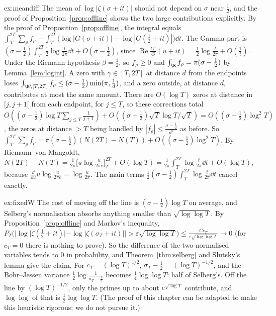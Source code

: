 \begin{solution}{ex:meandiff}
\idea The mean of $\log|\zeta(\sigma+it)|$ should not depend on $\sigma$ near $\frac12$, and the proof of Proposition~\ref{prop:offline} shows the two large contributions explicitly.
\writeup By the proof of Proposition~\ref{prop:offline}, the integral equals $\int_T^{2T}\sum_\rho f_\rho-\int_T^{2T}\bigl(\log|G(\sigma+it)|-\log|G(\frac12+it)|\bigr)\dd t$. The Gamma part is $(\sigma-\frac12)\int_T^{2T}\frac12\log\frac t{2\pi}\dd t+O(\sigma-\frac12)$, since $\operatorname{Re}\frac{G'}G(u+it)=\frac12\log\frac t{2\pi}+O(\frac1t)$. Under the Riemann hypothesis $\beta=\frac12$, so $f_\rho\ge0$ and $\int_\R f_\rho=\pi(\sigma-\frac12)$ by Lemma~\ref{lem:logint}. A zero with $\gamma\in[T,2T]$ at distance $d$ from the endpoints loses $\int_{\R\setminus[T,2T]}f_\rho\le(\sigma-\frac12)\min(\pi,\frac1d)$, and a zero outside, at distance $d$, contributes at most the same amount. There are $O(\log T)$ zeros at distance in $[j,j+1[$ from each endpoint, for $j\le T$, so these corrections total $O((\sigma-\frac12)\log T\sum_{j\le T}\frac1{j+1})+O((\sigma-\frac12)\sqrt T\log T/\sqrt T)=O((\sigma-\frac12)\log^2T)$, the zeros at distance $>T$ being handled by $|f_\rho|\le\frac{\sigma-\frac12}{d^2}$ as before. So $\int_T^{2T}\sum_\rho f_\rho=\pi(\sigma-\frac12)(N(2T)-N(T))+O((\sigma-\frac12)\log^2T)$. By Riemann--von Mangoldt, $N(2T)-N(T)=\frac1{2\pi}\bigl[u\log\frac u{2\pi e}\bigr]_T^{2T}+O(\log T)=\frac1{2\pi}\int_T^{2T}\log\frac t{2\pi}\dd t+O(\log T)$, because $\frac{\dd}{\dd u}u\log\frac u{2\pi e}=\log\frac u{2\pi}$. The main terms $\frac12(\sigma-\frac12)\int_T^{2T}\log\frac t{2\pi}\dd t$ cancel exactly.
\end{solution}

\begin{solution}{ex:fixedW}
\idea The cost of moving off the line is $(\sigma-\frac12)\log T$ on average, and Selberg's normalisation absorbs anything smaller than $\sqrt{\log\log T}$.
\writeup By Proposition~\ref{prop:offline} and Markov's inequality, $P_T\bigl(|\log|\zeta(\frac12+it)|-\log|\zeta(\sigma_T+it)||>\varepsilon\sqrt{\log\log T}\bigr)\le\frac{Cc_T}{\varepsilon\sqrt{\log\log T}}\to0$ (for $c_T=0$ there is nothing to prove). So the difference of the two normalised variables tends to $0$ in probability, and Theorem~\ref{thm:selberg} and Slutsky's lemma give the claim. For $c_T=(\log T)^{1/2}$, $\sigma_T-\frac12=(\log T)^{-1/2}$, and the Bohr--Jessen variance $\frac12\log\frac1{\sigma_T-\frac12}$ becomes $\frac14\log\log T$: half of Selberg's. Off the line by $(\log T)^{-1/2}$, only the primes up to about $e^{\sqrt{\log T}}$ contribute, and $\log\log$ of that is $\frac12\log\log T$. (The proof of this chapter can be adapted to make this heuristic rigorous; we do not pursue it.)
\end{solution}

